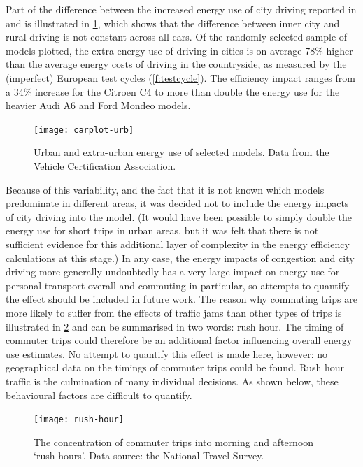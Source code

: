 Part of the difference between the increased energy use of city driving
reported in  \citet{Pelkmans2006} and \citet{Vlieger2000}
is illustrated in \cref{fcarplot-urb}, which shows that the
difference between inner
city and rural driving is not constant across all cars. Of the randomly
selected sample of models plotted, the extra energy use of driving in
cities is on average 78\% higher than the average energy costs of driving
in the countryside, as measured by the (imperfect) European test
cycles (\cref{f:testcycle}). The efficiency impact ranges from a
34\% increase for the
Citroen C4 to more than double the energy use for the heavier
Audi A6 and Ford Mondeo models.

\begin{figure}[h]
  \centerline{
    \texttt{[image: carplot-urb]}}
  \caption[Urban and extra-urban energy use of selected models]
  {Urban and extra-urban energy use of selected models.
  Data from \href{http://www.vcacarfueldata.org.uk/downloads/latest.asp}
  {the Vehicle Certification Association}.}
  \label{fcarplot-urb}
\end{figure}

Because of this variability, and the fact that it is not known which models
predominate in different areas, it was decided not to include the
energy impacts of city driving into the model.
(It would have been possible to simply double the energy use for
short trips in urban areas, but it was felt that there is not sufficient
evidence for this additional layer of complexity in the energy
efficiency calculations at this stage.)
In any case, the energy impacts of congestion and city driving
more generally undoubtedly has a very large impact on energy use for personal
transport overall and commuting in particular, so attempts to quantify the effect
should be included in future work. The reason why commuting trips are
more likely to suffer from the effects of traffic jams than other
types of trips is illustrated in \cref{frushhour} and can be summarised
in two words: rush hour. The timing of commuter trips could therefore be
an additional factor influencing overall energy use estimates. No attempt to
quantify this effect is made here, however: no geographical data on
the timings of commuter trips could be found.
Rush hour traffic is the culmination of many
individual decisions. As shown below, these behavioural factors are difficult
to quantify.

\begin{figure}[h]
  \centerline{
    \texttt{[image: rush-hour]}}
  \caption[The commuting `rush hours']
  {The concentration of commuter trips into morning
  and afternoon `rush hours'. Data source: the National Travel Survey.}
  \label{frushhour}
\end{figure}

